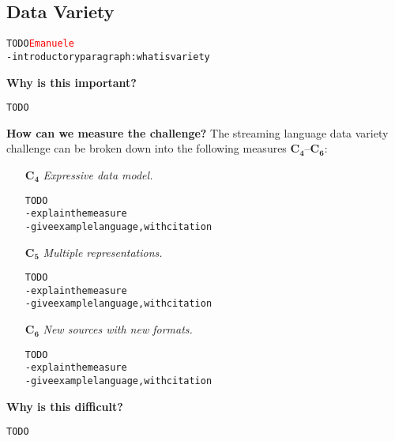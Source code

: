 \subsection{Data Variety}

\begin{alltt}TODO\scriptsize \textcolor{red}{Emanuele}
- introductory paragraph: what is variety
\end{alltt}

\textbf{Why is this important?}

\begin{alltt}TODO\scriptsize
\end{alltt}

\textbf{How can we measure the challenge?}
The streaming language data variety challenge can be broken down
into the following measures $\mathbf{C_4}$--$\mathbf{C_6}$:

\begin{itemize}
  \item[$\mathbf{C_4}$] \emph{Expressive data model.}
    \begin{alltt}TODO\scriptsize
- explain the measure
- give example language, with citation
    \end{alltt}
  \item[$\mathbf{C_5}$] \emph{Multiple representations.}
    \begin{alltt}TODO\scriptsize
- explain the measure
- give example language, with citation
    \end{alltt}
  \item[$\mathbf{C_6}$] \emph{New sources with new formats.}
    \begin{alltt}TODO\scriptsize
- explain the measure
- give example language, with citation
    \end{alltt}
\end{itemize}

\textbf{Why is this difficult?}

\begin{alltt}TODO\scriptsize
\end{alltt}
